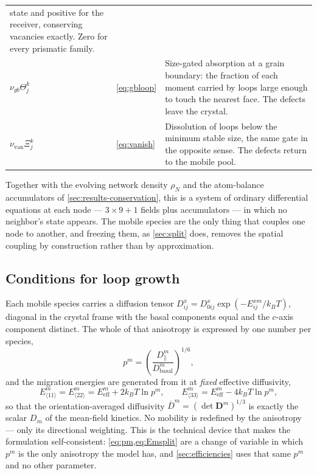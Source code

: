 \begin{table}[htbp]
\begin{tabularx}{\textwidth}{@{}>{\raggedright\arraybackslash}p{}
                              >{\raggedright\arraybackslash}p{}X@{}}
  state and positive for the receiver, conserving vacancies exactly. Zero for
  every prismatic family. \\
\addlinespace
$\nu_{gb}\Theta^{k}_{j}$
  & \cref{eq:gbloop} & Size-gated absorption at a grain boundary: the fraction
  of each moment carried by loops large enough to touch the nearest face. The
  defects leave the crystal. \\
\addlinespace
$\nu_{\mathrm{van}}\Xi^{k}_{j}$
  & \cref{eq:vanish} & Dissolution of loops below the minimum stable size, the
  same gate in the opposite sense. The defects return to the mobile pool. \\
\bottomrule
\end{tabularx}
\end{table}

Together with the evolving network density $\rho_N$ and the atom-balance
accumulators of \cref{sec:results-conservation}, this is a system of ordinary
differential equations at each node --- $3\times9+1$ fields plus accumulators ---
in which no neighbor's state appears. The mobile species are the only
thing that couples one node to another, and freezing them, as
\cref{sec:split} does, removes the spatial coupling by construction rather
than by approximation.

\subsection{Conditions for loop growth}
\label{sec:coexistence}\label{sec:transport}\label{sec:efficiencies}

Each mobile species carries a diffusion tensor
$D^{x}_{ij}=D^{x}_{0ij}\exp(-E^{xm}_{ij}/k_BT)$, diagonal in the crystal frame
with the basal components equal and the $c$-axis component distinct. The whole
of that anisotropy is expressed by one number per species,
\begin{equation}
  p^{m}=\left(\frac{D^{m}_{\parallel}}{D^{m}_{\mathrm{basal}}}\right)^{1/6},
  \label{eq:pm}
\end{equation}
and the migration energies are generated from it at \emph{fixed} effective
diffusivity,
\begin{equation}
  E^{m}_{\langle11\rangle}=E^{m}_{\langle22\rangle}=E^{m}_{\mathrm{eff}}+2k_BT\ln p^{m},
  \qquad
  E^{m}_{\langle33\rangle}=E^{m}_{\mathrm{eff}}-4k_BT\ln p^{m},
  \label{eq:Emsplit}
\end{equation}
so that the orientation-averaged diffusivity
$\overline D^{m}=(\det\bm D^{m})^{1/3}$ is exactly the scalar $D_m$ of the
mean-field kinetics. No mobility is redefined by the anisotropy --- only
its directional weighting. This is the technical device that makes the
formulation self-consistent: \cref{eq:pm,eq:Emsplit} are a change of variable in
which $p^{m}$ is the only anisotropy the model has, and \cref{sec:efficiencies}
uses that same $p^{m}$ and no other parameter.


